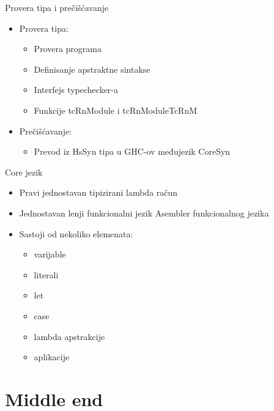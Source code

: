 \documentclass{beamer}
\begin{document}
\begin{frame}{Provera tipa i prečišćavanje}
	\begin{itemize}
	\item Provera tipa:
	\begin{itemize}
		\item Provera programa
		\item Definisanje apstraktne sintakse
		\item Interfejs typechecker-a 
		\item Funkcije tcRnModule i tcRnModuleTcRnM 
	\end{itemize}
	\end{itemize}
	
	\vspace{0.5cm}
	\begin{itemize}
	\item Prečišćavanje: \begin{itemize}
		\item Prevod iz HsSyn tipa u GHC-ov međujezik CoreSyn
	\end{itemize}
	\end{itemize}
\end{frame}

\begin{frame}{Core jezik}
		
	\begin{itemize}
		\item Pravi jednostavan tipizirani lambda račun
		\item Jednostavan lenji funkcionalni jezik Asembler funkcionalnog jezika
	\end{itemize}
	\begin{itemize}
		\item Sastoji od nekoliko elemenata:
	\begin{itemize}
		\item varijable
		\item literali
		\item let
		\item case
		\item lambda apstrakcije
		\item aplikacije
	\end{itemize}
	\end{itemize}
\end{frame}

\section{Middle end}
\end{document}
